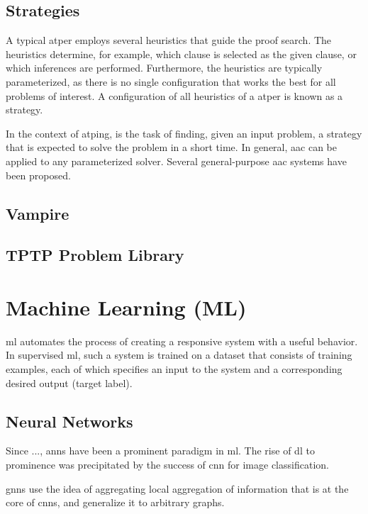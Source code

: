\subsection{Strategies}

A typical \gls{atper} employs several heuristics that guide the proof search.
The heuristics determine, for example, which clause is selected as the given clause, or which inferences are performed.
Furthermore, the heuristics are typically parameterized, as there is no single configuration that works the best for all problems of interest.
A configuration of all heuristics of a \gls{atper} is known as a strategy.

In the context of \gls{atping},  is the task of finding, given an input problem, a strategy that is expected to solve the problem in a short time.
In general, \gls{aac} can be applied to any parameterized solver.
Several general-purpose \gls{aac} systems have been proposed.

\subsection{Vampire}

\subsection{TPTP Problem Library}

\section{Machine Learning (ML)}

\Gls{ml} automates the process of creating a responsive system with a useful behavior.
In supervised \gls{ml}, such a system is trained on a dataset that consists of training examples,
each of which specifies an input to the system and a corresponding desired output (target label).

\subsection{Neural Networks}

Since ..., \glspl{ann} have been a prominent paradigm in \gls{ml}.
The rise of \gls{dl} to prominence was precipitated by the success of \gls{cnn} for image classification.

\Glspl{gnn} use the idea of aggregating local aggregation of information that is at the core of \glspl{cnn}, and generalize it to arbitrary graphs.

